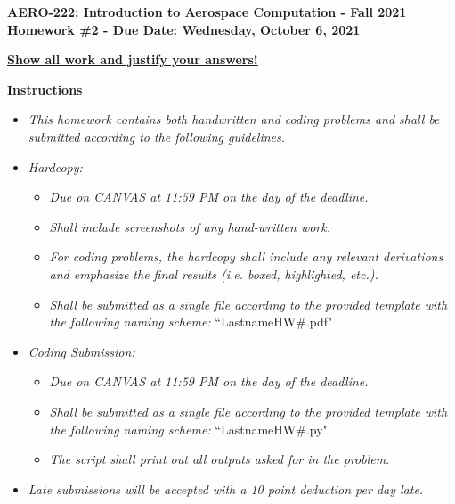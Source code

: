 \documentclass[12pt]{article}
\begin{document}
	
	\newif\ifsolution    %
	
	
	\begin{center}{\bf AERO-222: Introduction to Aerospace Computation - Fall 2021\\ Homework \#2 - Due Date: Wednesday, October 6, 2021} \vspace{0.5cm}
		
		\textbf{\underline{Show all work and justify your answers!}} \vspace{0.5cm}
	\end{center}
	
	{\Large \textbf{Instructions}}
	\begin{itemize}
		\item \textit{This homework contains both handwritten and coding problems and shall be submitted according to the following guidelines.}
		\item \textit{Hardcopy:}
		\begin{itemize}
			\item \textit{Due on CANVAS at 11:59 PM on the day of the deadline.}
			\item \textit{Shall include screenshots of any hand-written work.}
			\item \textit{For coding problems, the hardcopy shall include any relevant derivations and emphasize the final results (i.e. boxed, highlighted, etc.).}
			\item \textit{Shall be submitted as a single file according to the provided template with the following naming scheme:} ``LastnameHW\#.pdf"
		\end{itemize}
		\item \textit{Coding Submission:}
		\begin{itemize}
			\item \textit{Due on CANVAS at 11:59 PM on the day of the deadline.}
			\item \textit{Shall be submitted as a single file according to the provided template with the following naming scheme:} ``LastnameHW\#.py"
			\item \textit{The script shall print out all outputs asked for in the problem}.
		\end{itemize}
		\item \textit{Late submissions will be accepted with a 10 point deduction per day late.}
	\end{itemize}
	\hrulefill
	
\end{document}
